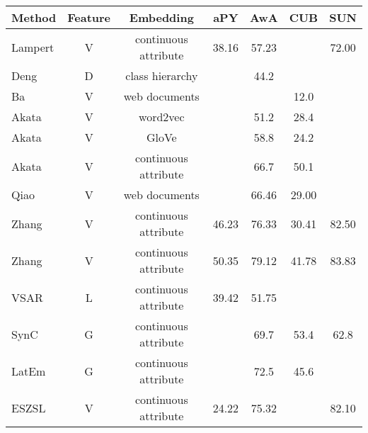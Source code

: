 \documentclass{bmvc2k}
\begin{document}
\begin{table*}[!t]
\begin{center}
\begin{tabular}{|l|c|c|c|c|c|c|}
\hline
Method &Feature &Embedding &aPY &AwA  &CUB &SUN\\
\hline\hline
Lampert \cite{Lampert14pami} & V &continuous attribute  &38.16 & 57.23 & &72.00 \\
Deng \cite{deng2014large} & D &class hierarchy  & & 44.2 &  & \\
Ba \cite{Ba2015ICCV} & V  &web documents  & &  &12.0  & \\
Akata \cite{Akata15output} &V &word2vec & & 51.2  & 28.4 & \\
Akata \cite{Akata15output} &V &GloVe & & 58.8 &  24.2 & \\
Akata \cite{Akata15output} &V &continuous attribute  & & 66.7 &  50.1 & \\
Qiao \cite{Qiao_2016_CVPR} &V &web documents & &66.46 &29.00 & \\
Zhang \cite{Zhang2015ICCV} &V &continuous attribute &46.23 &76.33 &30.41 &82.50 \\
Zhang \cite{Zhang2016CVPR} &V &continuous attribute &50.35 &79.12 &41.78 &83.83 \\
VSAR \cite{LongBMVC16} &L &continuous attribute &39.42 &51.75 & & \\
SynC \cite{SynC2016} &G & continuous attribute   & &69.7  &53.4 & 62.8  \\
LatEm \cite{LatEm2016} &G &continuous attribute &  &72.5   &45.6 & \\
ESZSL \cite{Romera2015ZSL} &V &continuous attribute &24.22 &75.32  &    &82.10 \\
\hline
\hline


\end{tabular}
\end{center}
\end{table*}
\end{document}
